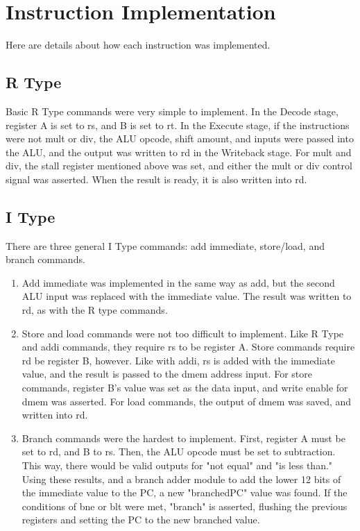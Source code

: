 \documentclass[letterpaper]{article} %
\begin{document}
\section*{Instruction Implementation}
Here are details about how each instruction was implemented.
\subsection*{R Type}
Basic R Type commands were very simple to implement. In the Decode stage, register A is set to rs, and B is set to rt. In the Execute stage, if the instructions were not mult or div, the ALU opcode, shift amount, and inputs were passed into the ALU, and the output was written to rd in the Writeback stage. For mult and div, the stall register mentioned above was set, and either the mult or div control signal was asserted. When the result is ready, it is also written into rd.

\subsection*{I Type}
There are three general I Type commands: add immediate, store/load, and branch commands.
\begin{enumerate}
\item Add immediate was implemented in the same way as add, but the second ALU input was replaced with the immediate value. The result was written to rd, as with the R type commands.
\item Store and load commands were not too difficult to implement. Like R Type and addi commands, they require rs to be register A. Store commands require rd be register B, however. Like with addi, rs is added with the immediate value, and the result is passed to the dmem address input. For store commands, register B's value was set as the data input, and write enable for dmem was asserted. For load commands, the output of dmem was saved, and written into rd.
\item Branch commands were the hardest to implement. First, register A must be set to rd, and B to rs. Then, the ALU opcode must be set to subtraction. This way, there would be valid outputs for "not equal" and "is less than." Using these results, and a branch adder module to add the lower 12 bits of the immediate value to the PC, a new "branchedPC" value was found. If the conditions of bne or blt were met, "branch" is asserted, flushing the previous registers and setting the PC to the new branched value. 
\end{enumerate}
\end{document}

